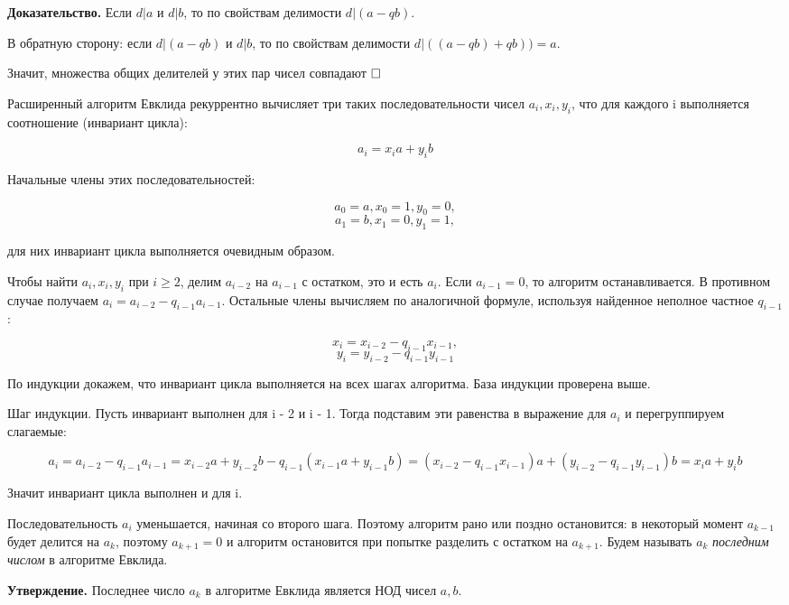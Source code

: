 \documentclass[a4paper, 10pt]{article}
\begin{document}
\textbf{Доказательство.} Если $d | a$ и $d | b$, то по свойствам делимости $d | (a - qb)$.

В обратную сторону: если $d | (a - qb)$ и $d | b$, то по свойствам делимости $d | ((a - qb) + qb)) = a$.

Значит, множества общих делителей у этих пар чисел совпадают $\hfill \square$

\medskip

Расширенный алгоритм Евклида рекуррентно вычисляет три таких последовательности чисел $a_i, x_i, y_i$, что для каждого i выполняется соотношение (инвариант цикла):

$$a_i = x_ia + y_ib$$

Начальные члены этих последовательностей:

$$a_0 = a, x_0 = 1, y_0 = 0,$$
$$a_1 = b, x_1 = 0, y_1 = 1,$$

для них инвариант цикла выполняется очевидным образом.

Чтобы найти $a_i, x_i, y_i$ при $i \geqslant 2$, делим $a_{i - 2}$ на $a_{i - 1}$ с остатком, это и есть $a_i$. Если $a_{i - 1} = 0$, то алгоритм останавливается. В противном случае получаем $a_i = a_{i - 2} - q_{i - 1}a_{i-1}$. Остальные члены вычисляем по аналогичной формуле, используя найденное неполное частное $q_{i - 1}$:

$$x_i = x_{i - 2} - q_{i - 1}x_{i - 1},$$
$$y_i = y_{i - 2} - q_{i - 1}y_{i - 1}$$

По индукции докажем, что инвариант цикла выполняется на всех шагах алгоритма. База индукции проверена выше.

Шаг индукции. Пусть инвариант выполнен для i - 2 и i - 1. Тогда подставим эти равенства в выражение для $a_i$ и перегруппируем слагаемые:

$$a_i = a_{i - 2} - q_{i - 1}a_{i - 1} = x_{i - 2}a + y_{i - 2}b - q_{i - 1}(x_{i - 1}a + y_{i - 1}b) = (x_{i - 2} - q_{i - 1}x_{i - 1})a + (y_{i - 2} - q_{i - 1}y_{i - 1})b = x_ia + y_ib$$

Значит инвариант цикла выполнен и для i.

Последовательность $a_i$ уменьшается, начиная со второго шага. Поэтому алгоритм рано или поздно остановится: в некоторый момент $a_{k - 1}$ будет делится на $a_k$, поэтому $a_{k + 1} = 0$ и алгоритм остановится при попытке разделить с остатком на $a_{k + 1}$. Будем называть $a_k$ \textit{последним числом} в алгоритме Евклида.


\textbf{Утверждение.} Последнее число $a_k$ в алгоритме Евклида является НОД чисел $a, b$.
\end{document}
